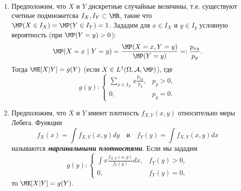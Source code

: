 \begin{exmp} \label{exmp1.16} \
	\begin{enumerate}
		\item Предположим, что $X$ и $Y$ дискретные случайные величины, т.е. существуют счетные подмножетсва $I_X, I_Y \subset \MR$, такие что $\MP(X \in I_X)=\MP(Y \in I_Y)=1$. Зададим для $x \in I_X$ и $y \in I_y$ условную вероятность (при $\MP(Y=y)>0$):
		\[ \MP(X=x\ |\ Y=y)=\frac{\MP(X=x, Y=y)}{\MP(Y=y)}=:\frac{p_{xy}}{p_y}.\]
		Тогда $\ME[X|Y]=g(Y)$ (если $X \in L^1(\Omega, \mathcal{A}, \MP)$), где
		\[ g(y) :
		\left \{
		\begin{array}{ll}
		\sum_{x \in I_X} x \frac{p_{xy}}{p_y}, & p_y>0, \\
		0, & p_y=0.
		\end{array}
		\right.
		\]
		\item Предположим, что $X$ и $Y$ имеют плотность $f_{X,Y}(x,y)$ относительно меры Лебега. Функции
		\[ f_X(x)=\int f_{X,Y}(x,y)dy \quad \text{и} \quad f_Y(y)=\int f_{X,Y}(x,y)dx \]
		называются \textbf{\textit{маргинальными плотностями}}. Если мы зададим
		\[ g(y) :
		\left \{
		\begin{array}{ll}
		\int x \frac{f_{X,Y}(x,y)}{f_Y(y)}dx, & f_Y(y)>0, \\
		0, & f_Y(y)=0,
		\end{array}
		\right.
		\]
		то $\ME[X|Y]=g(Y)$.
	\end{enumerate}
\end{exmp}

